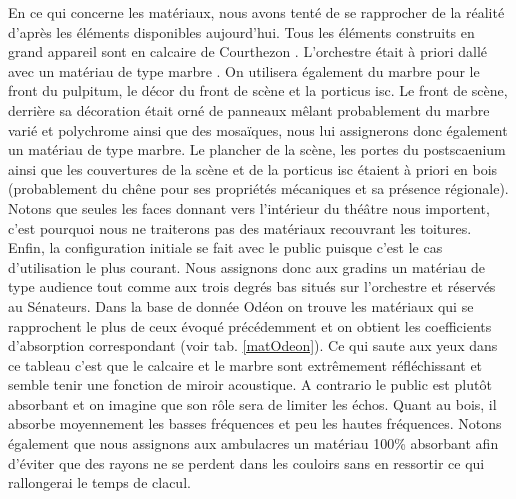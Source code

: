 En ce qui concerne les matériaux, nous avons tenté de se rapprocher de la réalité d'après les éléments disponibles aujourd'hui. Tous les éléments construits en grand appareil sont en calcaire de Courthezon \cite[p.43]{orangeTxt}. L'orchestre était à priori dallé avec un matériau de type marbre \cite[p.337]{orangeTxt}. On utilisera également du marbre pour le front du \gls{pulpitum}, le décor du front de scène et la \gls{porticus isc}. Le front de scène, derrière sa décoration était orné de panneaux mêlant probablement du marbre varié et polychrome ainsi que des mosaïques, nous lui assignerons donc également un matériau de type marbre. Le plancher de la scène, les portes du \gls{postscaenium} ainsi que les couvertures de la scène et de la \gls{porticus isc} étaient à priori en bois (probablement du chêne pour ses propriétés mécaniques et sa présence régionale). Notons que seules les faces donnant vers l'intérieur du théâtre nous importent, c'est pourquoi nous ne traiterons pas des matériaux recouvrant les toitures. Enfin, la configuration initiale se fait avec le public puisque c'est le cas d'utilisation le plus courant. Nous assignons donc aux gradins un matériau de type audience tout comme aux trois degrés bas situés sur l'orchestre et réservés au Sénateurs. Dans la base de donnée Odéon \cite[materials]{odeon} on trouve les matériaux qui se rapprochent le plus de ceux évoqué précédemment et on obtient les coefficients d'absorption correspondant (voir tab. \ref{matOdeon}). Ce qui saute aux yeux dans ce tableau c'est que le calcaire et le marbre sont extrêmement réfléchissant et semble tenir une fonction de miroir acoustique. A contrario le public est plutôt absorbant et on imagine que son rôle sera de limiter les échos. Quant au bois, il absorbe moyennement les basses fréquences et peu les hautes fréquences. Notons également que nous assignons aux ambulacres un matériau 100\% absorbant afin d'éviter que des rayons ne se perdent dans les couloirs sans en ressortir ce qui rallongerai le temps de clacul.
%
